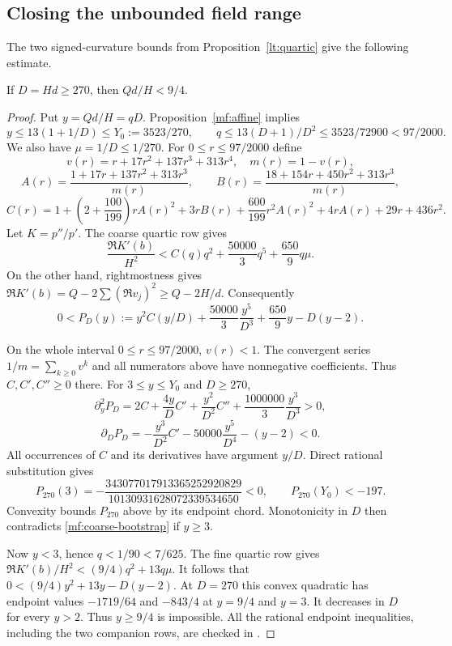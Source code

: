 \subsection{Closing the unbounded field range}

The two signed-curvature bounds from Proposition~\ref{lt:quartic}
give the following estimate.

\begin{proposition}\label{mf:D270}
If $D=Hd\ge270$, then $Qd/H<9/4$.
\end{proposition}
\begin{proof}
Put $y=Qd/H=qD$. Proposition~\ref{mf:affine} implies
\[
 y\le13(1+1/D)\le Y_0:=3523/270,\qquad
 q\le13(D+1)/D^2\le3523/72900<97/2000.
\]
We also have $\mu=1/D\le1/270$.
For $0\le r\le97/2000$ define
\[
 v(r)=r+17r^2+137r^3+313r^4,\quad m(r)=1-v(r),
\]
\[
 A(r)=\frac{1+17r+137r^2+313r^3}{m(r)},\qquad
 B(r)=\frac{18+154r+450r^2+313r^3}{m(r)},
\]
\[
 C(r)=1+\left(2+\frac{100}{199}\right)rA(r)^2
 +3rB(r)+\frac{600}{199}r^2A(r)^2
 +4rA(r)+29r+436r^2.
\]
Let $K=p''/p'$. The coarse quartic row gives
\[
 \frac{\Re K'(b)}{H^2}
 <C(q)q^2+\frac{50000}{3}q^5+\frac{650}{9}q\mu.
\]
On the other hand, rightmostness gives
$\Re K'(b)=Q-2\sum(\Re v_j)^2\ge Q-2H/d$.
Consequently
\begin{equation}\label{mf:coarse-bootstrap}
 0<P_D(y):=y^2C(y/D)+\frac{50000}{3}\frac{y^5}{D^3}
                       +\frac{650}{9}y-D(y-2).
\end{equation}

On the whole interval $0\le r\le97/2000$, $v(r)<1$.
The convergent series $1/m=\sum_{k\ge0}v^k$ and all numerators
above have nonnegative coefficients. Thus $C,C',C''\ge0$ there.
For $3\le y\le Y_0$ and $D\ge270$,
\[
 \partial_y^2P_D
 =2C+\frac{4y}{D}C'+\frac{y^2}{D^2}C''
                      +\frac{1000000}{3}\frac{y^3}{D^3}>0,
\]
\[
 \partial_DP_D=-\frac{y^3}{D^2}C'
                    -50000\frac{y^5}{D^4}-(y-2)<0.
\]
All occurrences of $C$ and its derivatives have argument $y/D$.
Direct rational substitution gives
\[
 P_{270}(3)=
 -\frac{343077017913365252920829}{10130931628072339534650}<0,
 \qquad P_{270}(Y_0)<-197.
\]
Convexity bounds $P_{270}$ above by its endpoint chord.
Monotonicity in $D$ then contradicts
\eqref{mf:coarse-bootstrap} if $y\ge3$.

Now $y<3$, hence $q<1/90<7/625$.
The fine quartic row gives
$\Re K'(b)/H^2<(9/4)q^2+13q\mu$.
It follows that
$0<(9/4)y^2+13y-D(y-2)$.
At $D=270$ this convex quadratic has endpoint values
$-1719/64$ and $-843/4$ at $y=9/4$ and $y=3$.
It decreases in $D$ for every $y>2$. Thus $y\ge9/4$ is
impossible. All the rational endpoint inequalities, including
the two companion rows, are checked in
.
\end{proof}

